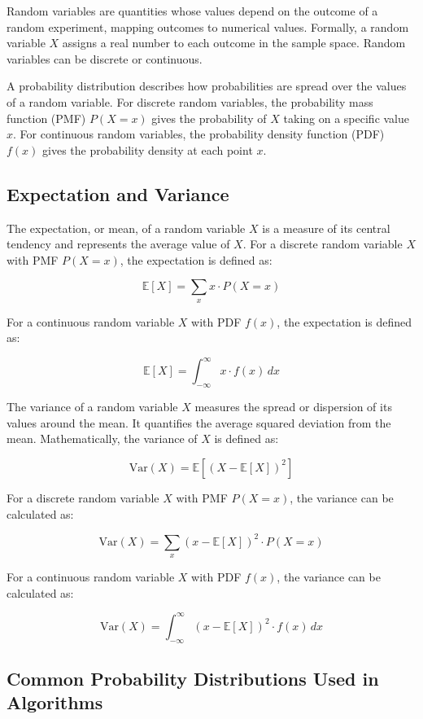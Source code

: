\documentclass[12pt]{book} %
\begin{document}
Random variables are quantities whose values depend on the outcome of a random experiment, mapping outcomes to numerical values. Formally, a random variable \(X\) assigns a real number to each outcome in the sample space. Random variables can be discrete or continuous.

A probability distribution describes how probabilities are spread over the values of a random variable. For discrete random variables, the probability mass function (PMF) \(P(X=x)\) gives the probability of \(X\) taking on a specific value \(x\). For continuous random variables, the probability density function (PDF) \(f(x)\) gives the probability density at each point \(x\).


\subsection{Expectation and Variance}

The expectation, or mean, of a random variable \(X\) is a measure of its central tendency and represents the average value of \(X\). For a discrete random variable \(X\) with PMF \(P(X=x)\), the expectation is defined as:

\[
\mathbb{E}[X] = \sum_{x} x \cdot P(X=x)
\]

For a continuous random variable \(X\) with PDF \(f(x)\), the expectation is defined as:

\[
\mathbb{E}[X] = \int_{-\infty}^{\infty} x \cdot f(x) \, dx
\]

The variance of a random variable \(X\) measures the spread or dispersion of its values around the mean. It quantifies the average squared deviation from the mean. Mathematically, the variance of \(X\) is defined as:

\[
\text{Var}(X) = \mathbb{E}[(X - \mathbb{E}[X])^2]
\]

For a discrete random variable \(X\) with PMF \(P(X=x)\), the variance can be calculated as:

\[
\text{Var}(X) = \sum_{x} (x - \mathbb{E}[X])^2 \cdot P(X=x)
\]

For a continuous random variable \(X\) with PDF \(f(x)\), the variance can be calculated as:

\[
\text{Var}(X) = \int_{-\infty}^{\infty} (x - \mathbb{E}[X])^2 \cdot f(x) \, dx
\]

\subsection{Common Probability Distributions Used in Algorithms}
\end{document}
